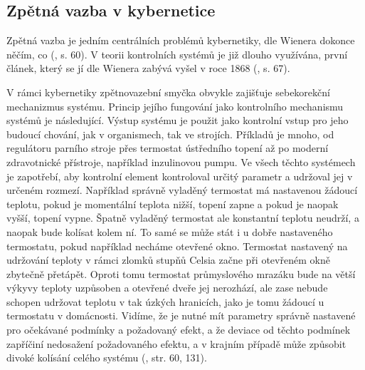\documentclass[11pt,a4paper]{article}
\begin{document}
\subsubsection{}


\subsection{Zpětná vazba v kybernetice}

Zpětná vazba je jedním centrálních problémů kybernetiky, dle Wienera dokonce něčím, co (\cite{wiener_cybernetics_2019}, s. 60). 
V teorii kontrolních systémů je již dlouho využívána, první článek, který se jí dle Wienera zabývá vyšel v roce 1868 (\cite{maxwell_governors_1868, wiener_cybernetics_2019}, s. 67). 

V rámci kybernetiky zpětnovazební smyčka obvykle zajišťuje sebekorekční mechanizmus systému. Princip jejího fungování jako kontrolního mechanismu systémů je následující. Výstup systému je použit jako kontrolní vstup pro jeho budoucí chování, jak v organismech, tak ve strojích. Příkladů je mnoho, od regulátoru parního stroje přes termostat ústředního topení až po moderní zdravotnické přístroje, například inzulinovou pumpu. Ve všech těchto systémech je zapotřebí, aby kontrolní element kontroloval určitý parametr a udržoval jej v určeném rozmezí. Například správně vyladěný termostat má nastavenou žádoucí teplotu, pokud je momentální teplota nižší, topení zapne a pokud je naopak vyšší, topení vypne. Špatně vyladěný termostat ale konstantní teplotu neudrží, a naopak bude kolísat kolem ní. To samé se může stát i u dobře nastaveného termostatu, pokud například necháme otevřené okno. Termostat nastavený na udržování teploty v rámci zlomků stupňů Celsia začne při otevřeném okně zbytečně přetápět. Oproti tomu termostat průmyslového mrazáku bude na větší výkyvy teploty uzpůsoben a otevřené dveře jej nerozhází, ale zase nebude schopen udržovat teplotu v tak úzkých hranicích, jako je tomu žádoucí u termostatu v domácnosti. Vidíme, že je nutné mít parametry správně nastavené pro očekávané podmínky a požadovaný efekt, a že deviace od těchto podmínek zapříčiní nedosažení požadovaného efektu, a v krajním případě může způsobit divoké kolísání celého systému (\cite{wiener_cybernetics_2019}, str. 60, 131). 
\end{document}
